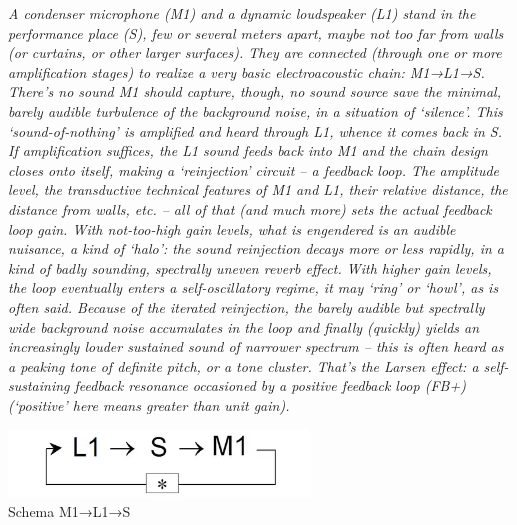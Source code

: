 \begin{center}
\vspace{0.5cm}
\textit{A condenser microphone (M1) and a dynamic loudspeaker (L1) stand in the performance place
(S), few or several meters apart, maybe not too far from walls (or curtains, or other larger
surfaces). They are connected (through one or more amplification stages) to realize a very
basic electroacoustic chain: M1→L1→S. There’s no sound M1 should capture, though, no sound
source save the minimal, barely audible turbulence of the background noise, in a situation of
‘silence’. This ‘sound-of-nothing’ is amplified and heard through L1, whence it comes back in
S. \\
If amplification suffices, the L1 sound feeds back into M1 and the chain design closes onto
itself, making a ‘reinjection’ circuit – a feedback loop. The amplitude level, the
transductive technical features of M1 and L1, their relative distance, the distance from
walls, etc. – all of that (and much more) sets the actual feedback loop gain. With
not-too-high gain levels, what is engendered is an audible nuisance, a kind of ‘halo’: the
sound reinjection decays more or less rapidly, in a kind of badly sounding, spectrally uneven
reverb effect. With higher gain levels, the loop eventually enters a self-oscillatory regime,
it may ‘ring’ or ‘howl’, as is often said. Because of the iterated reinjection, the barely
audible but spectrally wide background noise accumulates in the loop and finally (quickly)
yields an increasingly louder sustained sound of narrower spectrum – this is often heard as a
peaking tone of definite pitch, or a tone cluster. That’s the Larsen effect: a self-sustaining
feedback resonance occasioned by a positive feedback loop (FB+) (‘positive’ here means greater
than unit gain).}
\vspace{0.5cm}
\vspace{0.5cm}
\end{center}

\begin{center}
\vspace{0.5cm}
\includegraphics[width=8cm]{figures/larsen_feedback_scheme.png} \\
{Schema M1→L1→S} \\ 
\vspace{0.5cm}
\end{center}

